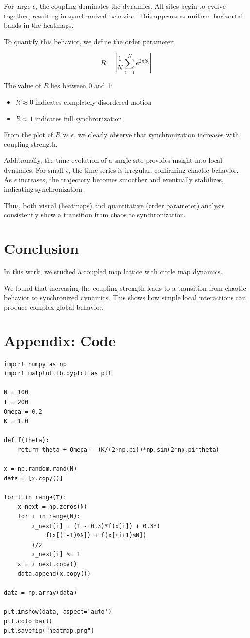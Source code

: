 \documentclass[12pt]{article}
\begin{document}
For large $\epsilon$, the coupling dominates the dynamics. All sites begin to evolve together, resulting in synchronized behavior. This appears as uniform horizontal bands in the heatmaps.

To quantify this behavior, we define the order parameter:

\begin{equation}
R = \left| \frac{1}{N} \sum_{i=1}^{N} e^{2\pi i \theta_i} \right|
\end{equation}

The value of $R$ lies between 0 and 1:
\begin{itemize}
    \item $R \approx 0$ indicates completely disordered motion
    \item $R \approx 1$ indicates full synchronization
\end{itemize}

From the plot of $R$ vs $\epsilon$, we clearly observe that synchronization increases with coupling strength.

Additionally, the time evolution of a single site provides insight into local dynamics. For small $\epsilon$, the time series is irregular, confirming chaotic behavior. As $\epsilon$ increases, the trajectory becomes smoother and eventually stabilizes, indicating synchronization.

Thus, both visual (heatmaps) and quantitative (order parameter) analysis consistently show a transition from chaos to synchronization.

\section{Conclusion}

In this work, we studied a coupled map lattice with circle map dynamics. 

We found that increasing the coupling strength leads to a transition from chaotic behavior to synchronized dynamics. This shows how simple local interactions can produce complex global behavior.

\section{Appendix: Code}

\begin{lstlisting}
import numpy as np
import matplotlib.pyplot as plt

N = 100
T = 200
Omega = 0.2
K = 1.0

def f(theta):
    return theta + Omega - (K/(2*np.pi))*np.sin(2*np.pi*theta)

x = np.random.rand(N)
data = [x.copy()]

for t in range(T):
    x_next = np.zeros(N)
    for i in range(N):
        x_next[i] = (1 - 0.3)*f(x[i]) + 0.3*(
            f(x[(i-1)%N]) + f(x[(i+1)%N])
        )/2
        x_next[i] %= 1
    x = x_next.copy()
    data.append(x.copy())

data = np.array(data)

plt.imshow(data, aspect='auto')
plt.colorbar()
plt.savefig("heatmap.png")
\end{lstlisting}
\end{document}
